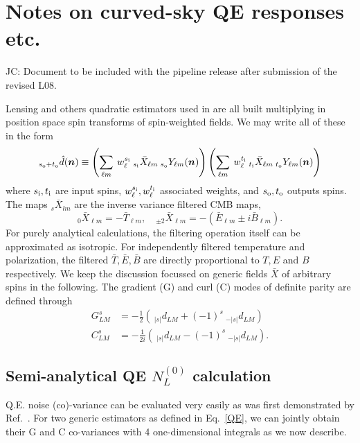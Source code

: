 \documentclass[reprint,prd, superscriptaddress, tightenlines, longbibliography, nofootinbib, eqsecnum, amsfonts, amsmath, floatfix, notitlepage, onecolumn]{revtex4-1}
\newcommand{\si}[0]{{s_{\rm i}}}
\newcommand{\ti}[0]{{t_{\rm i}}}
\newcommand{\so}[0]{{s_{\rm o}}}
\renewcommand{\to}[0]{{t_{\rm o}}}
\newcommand{\JC}[1]{\color{red}JC: #1\color{black}}
\newcommand{\hn}[0]{\boldsymbol{n}}
\begin{document}
	
\tableofcontents

\section{   Notes on curved-sky QE responses etc.}
\JC{Document to be included with the pipeline release after submission of the revised L08.}

Lensing and others quadratic estimators used in \cite{??} are all built multiplying in position space spin transforms of spin-weighted fields. We may write all of these in the form \begin{equation}\label{QE}
 _{\so + \to}\hat d(\hn) \equiv  \left(\sum_{\ell m}\: w^{\si}_\ell \:_{\si} \bar X_{\ell m} \:_\so Y_{\ell m}(\hn)\right)\left(\sum_{\ell m}\:w^{\ti}_\ell  \:_{\ti} \bar X_{\ell m} \:_\to Y_{\ell m}(\hn)\right)
\end{equation}
where $\si, \ti$ are input spins, $w_\ell^\si, w_\ell^{\ti}$ associated weights, and  $\so, \to$ outputs spins. The maps $_s \bar X_{lm}$ are the inverse variance filtered CMB maps,
\begin{equation}
	_0 \bar X_{\ell m} = -\bar T_{\ell m} , \quad _{\pm 2} \bar X_{\ell m} = -\left(\bar E_{\ell m} \pm i\bar B_{\ell m} \right).
\end{equation}
For purely analytical calculations, the filtering operation itself can be approximated as isotropic. For independently filtered temperature and polarization, the filtered $\bar T, \bar E, \bar B$ are directly proportional to $T, E$ and $B$ respectively. 
We keep the discussion focussed on generic fields $\bar X$ of arbitrary spins in the following. The gradient (G) and curl (C) modes of definite parity are defined through
\begin{eqnarray*}
		G^{s}_{LM} &= -\frac 12\left(\:_{|s|} d_{LM} + (-1)^s \:_{-|s|} d_{LM}\right)  \\
		C^{s}_{LM} &=-\frac 1{2i} \left( \:_{|s|} d_{LM} - (-1)^s \:_{-|s|} d_{LM} \right) .
\end{eqnarray*}
\subsection{Semi-analytical QE $N^{(0)}_L$ calculation}
Q.E. noise (co)-variance can be evaluated very easily as was first demonstrated by Ref.~\cite{}. For two generic estimators as defined in Eq.~\eqref{QE}, we can jointly obtain their G and C co-variances with 4 one-dimensional integrals as we now describe.
\end{document}
